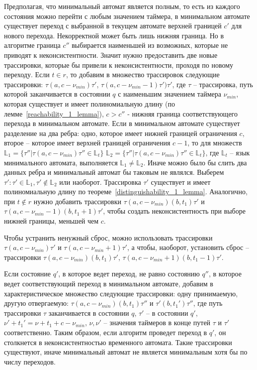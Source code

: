 \documentclass[times,specification,annotation]{itmo-student-thesis}
\begin{document}
Предполагая, что минимальный автомат является полным, то есть из каждого состояния можно перейти с любым значением таймера, в минимальном автомате существует переход с выбранной в текущем
автомате верхней границей $c'$ для нового перехода. Некорректной может быть лишь нижняя граница. Но в алгоритме граница $c''$ выбирается наименьшей из возможных, которые не приводят к неконсистентности.
Значит нужно предоставить две новые трассировки, которые бы привели к неконсистентности, проходя по новому переходу. Если $t \in r$, то добавим в множество трассировок
следующие трассировки: $\tau(a, c - \nu_{min})\tau'$, $\tau(a, c - \nu_{min} - 1)\tau')\tau'$, где $\tau$ -- трассировка, путь которой заканчивается в состоянии $q$ с наименьшим значением таймера 
$\nu_{min}$, которая существует и имеет полиномиальную длину (по лемме~\ref{reachability_1_lemma}), $c > c''$ - нижняя граница соответствующего перехода в минимальном автомате. 
Если в минимальном автомате существует разделение на два ребра: одно, которое имеет нижней границей 
ограничения $c$, второе -- которое имеет верхней границей ограничения $c - 1$, то для множеств $\mathbb{L}_1 = \{\tau'' | \tau(a, c - \nu_{min})\tau'' \in \mathbb{L}_t \}$
$\mathbb{L}_2 = \{\tau'' | \tau(a, c - \nu_{min})\tau'' \in \mathbb{L}_t \}$, где $\mathbb{L}_t$ -- язык минимального автомата, выполняется $\mathbb{L}_1 \neq \mathbb{L}_2$. 
Иначе можно было бы слить два данных ребра и минимальный автомат бы таковым не являлся. Выберем $\tau': \tau' \in \mathbb{L}_1, \tau' \not\in \mathbb{L}_2$ или наоборот. 
Трассировка $\tau'$ существует и имеет полиномиальную длину по теореме~\ref{distinguishability_1_lemma}. Аналогично, при $t \not\in r$ нужно добавить трассировки $\tau(a, c - \nu_{min})(b, t_1)\tau'$ и
$\tau(a, c - \nu_{min} - 1)(b, t_1 + 1)\tau'$, чтобы создать неконсистентность при выборе нижней границы, меньшей чем $c$.

Чтобы устранить ненужный сброс, можно использовать трассировки $\tau(a, c - \nu_{min})\tau'$ и $\tau(a, c - \nu_{min} + 1)\tau'$, а чтобы, наоборот, установить сброс -- трассировки
$\tau(a, c - \nu_{min})(b, t_1)\tau'$, $\tau(a, c - \nu_{min} + 1)(b, t_1 - 1)\tau'$.

Если состояние $q'$, в которое ведет переход, не равно состоянию $q''$, в которое ведет соответствующий переход в минимальном автомате, добавим в характеристическое множество следующие трассировки: одну
принимаемую, другую отвергаемую:
$\tau(a, c - \nu_{min})(b, t_1)\tau''$ и $\tau'(b, t_1')\tau''$, где путь трассировки $\tau$ заканчивается в состоянии $q$, $\tau'$ -- в состоянии $q'$, $\nu' + t_1' = \nu + t_1 + c - \nu_{min}$,
$\nu, \nu'$ -- значения таймеров в конце путей $\tau$ и $\tau'$ соответственно. Таким образом, если алгоритм проведет переход в $q'$, он столкнется в неконсистентностью временного автомата.
Такие трассировки существуют, иначе минимальный автомат не является минимальным хотя бы по числу переходов.
\end{document}
